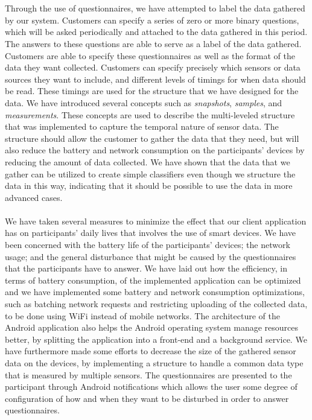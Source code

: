 \\\\
Through the use of questionnaires, we have attempted to label the data gathered by our system. Customers can specify a series of zero or more binary questions, which will be asked periodically and attached to the data gathered in this period. The answers to these questions are able to serve as a label of the data gathered. Customers are able to specify these questionnaires as well as the format of the data they want collected. Customers can specify precisely which sensors or data sources they want to include, and different levels of timings for when data should be read. These timings are used for the structure that we have designed for the data. We have introduced several concepts such as \emph{snapshots}, \emph{samples}, and \emph{measurements}. These concepts are used to describe the multi-leveled structure that was implemented to capture the temporal nature of sensor data. The structure should allow the customer to gather the data that they need, but will also reduce the battery and network consumption on the participants' devices by reducing the amount of data collected. We have shown that the data that we gather can be utilized to create simple classifiers even though we structure the data in this way, indicating that it should be possible to use the data in more advanced cases.
\\\\
We have taken several measures to minimize the effect that our client application has on participants' daily lives that involves the use of smart devices. We have been concerned with the battery life of the participants' devices; the network usage; and the general disturbance that might be caused by the questionnaires that the participants have to answer. We have laid out how the efficiency, in terms of battery consumption, of the implemented application can be optimized and we have implemented some battery and network consumption optimizations, such as batching network requests and restricting uploading of the collected data, to be done using WiFi instead of mobile networks. The architecture of the Android application also helps the Android operating system manage resources better, by splitting the application into a front-end and a background service. We have furthermore made some efforts to decrease the size of the gathered sensor data on the devices, by implementing a structure to handle a common data type that is measured by multiple sensors. The questionnaires are presented to the participant through Android notifications which allows the user some degree of configuration of how and when they want to be disturbed in order to answer questionnaires. %
